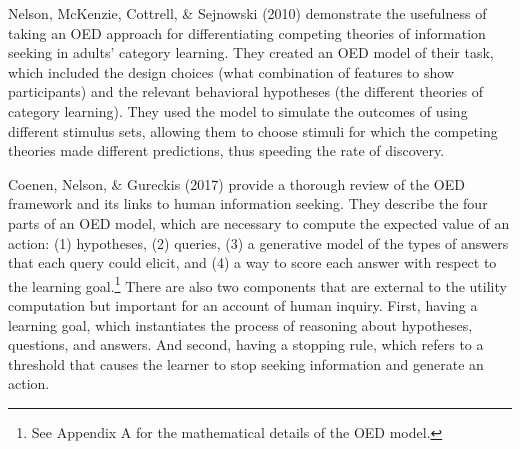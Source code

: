 \documentclass[oneside]{report}
\begin{document}

Nelson, McKenzie, Cottrell, \& Sejnowski (2010) demonstrate the
usefulness of taking an OED approach for differentiating competing
theories of information seeking in adults' category learning. They
created an OED model of their task, which included the design choices
(what combination of features to show participants) and the relevant
behavioral hypotheses (the different theories of category learning).
They used the model to simulate the outcomes of using different stimulus
sets, allowing them to choose stimuli for which the competing theories
made different predictions, thus speeding the rate of discovery.

Coenen, Nelson, \& Gureckis (2017) provide a thorough review of the OED
framework and its links to human information seeking. They describe the
four parts of an OED model, which are necessary to compute the expected
value of an action: (1) hypotheses, (2) queries, (3) a generative model
of the types of answers that each query could elicit, and (4) a way to
score each answer with respect to the learning goal.\footnote{See
  Appendix A for the mathematical details of the OED model.} There are
also two components that are external to the utility computation but
important for an account of human inquiry. First, having a learning
goal, which instantiates the process of reasoning about hypotheses,
questions, and answers. And second, having a stopping rule, which refers
to a threshold that causes the learner to stop seeking information and
generate an action.
\end{document}
